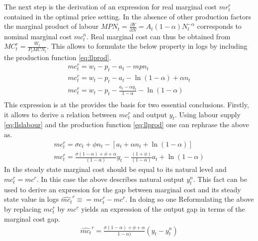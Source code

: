 \documentclass[12pt,a4paper,english]{article} %
\begin{document}
	The next step is the derivation of an expression for real marginal cost $mr_{t}^r$ contained in the optimal price setting. In the absence of other production factors the marginal product of labour $MPN_t = \frac{\partial Y}{\partial N} = A_t (1- \alpha) N_t^{-\alpha}$ corresponds to nominal marginal cost $mc_t^n$. Real marginal cost can thus be obtained from $MC_t^r = \frac{W_t}{P_t MCN_t}$. This allows to formulate the below property in logs by including the production function \ref{eq:llprod}.
	\begin{equation}
		\begin{aligned}
			mc_t^r = w_t - p_t - a_t - mpn_t \\
			mc_t^r = w_t - p_t - a_t - \ln(1 - \alpha) + \alpha n_t \\
			mc_t^r = w_t - p_t - \frac{a_t - \alpha y_t}{1 - \alpha} - \ln(1 - \alpha) \\
		\end{aligned}
	\end{equation}
	This expression is at the provides the basis for two essential conclusions. 
	Firstly, it allows to derive a relation between $mc_t^r$ and output $y_t$. Using labour supply \ref{eq:llslabour} and the production function \ref{eq:llprod} one can rephrase the above as. 
	\begin{equation}
		\begin{aligned}
			mc_t^r = \sigma c_t + \phi n_t - [a_t + \alpha n_t + \ln(1-\alpha)] \\
			mc_t^r = 
			\frac{
				\sigma (1 - \alpha) + \phi + \alpha
			}{
				(1 - \alpha)	
			}	 y_t
			- \frac{
				(1 + \phi)	
			}{
				(1 - \alpha)	
			} a_t
			+ \ln(1-\alpha)
		\end{aligned}
	\end{equation}
	In the steady state marginal cost should be equal to its natural level and $mc_t^r = mc^r$. In this case the above describes natural output $y_t^n$. This fact can be used to derive an expression for the gap between marginal cost and its steady state value in logs $\hat{mc_t}^r \equiv = mc_t^r - mc^r$. In doing so one 
	Reformulating the above by replacing $mc_t^r$ by $mc^r$ yields an expression of the output gap in terms of the marginal cost gap. 
	\begin{equation} \label{eq:llmcrhat}
		\begin{aligned}
			\hat{mc_t}^r = \frac{\sigma (1 - \alpha) + \phi + \alpha}
			{1 - \alpha)} (y_t - y_t^n)
		\end{aligned}
	\end{equation}
\end{document}
